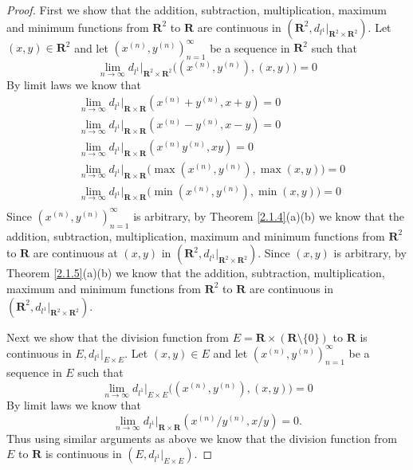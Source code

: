 \begin{proof}
    First we show that the addition, subtraction, multiplication, maximum and minimum functions from \(\mathbf{R}^2\) to \(\mathbf{R}\) are continuous in \((\mathbf{R}^2, d_{l^1}|_{\mathbf{R}^2 \times \mathbf{R}^2})\).
    Let \((x, y) \in \mathbf{R}^2\) and let \((x^{(n)}, y^{(n)})_{n = 1}^\infty\) be a sequence in \(\mathbf{R}^2\) such that
    \[
        \lim_{n \to \infty} d_{l^1}|_{\mathbf{R}^2 \times \mathbf{R}^2}\big((x^{(n)}, y^{(n)}), (x, y)\big) = 0
    \]
    By limit laws we know that
    \begin{align*}
         & \lim_{n \to \infty} d_{l^1}|_{\mathbf{R} \times \mathbf{R}}(x^{(n)} + y^{(n)}, x + y) = 0                   \\
         & \lim_{n \to \infty} d_{l^1}|_{\mathbf{R} \times \mathbf{R}}(x^{(n)} - y^{(n)}, x - y) = 0                   \\
         & \lim_{n \to \infty} d_{l^1}|_{\mathbf{R} \times \mathbf{R}}(x^{(n)} y^{(n)}, xy) = 0                        \\
         & \lim_{n \to \infty} d_{l^1}|_{\mathbf{R} \times \mathbf{R}}\big(\max(x^{(n)}, y^{(n)}), \max(x, y)\big) = 0 \\
         & \lim_{n \to \infty} d_{l^1}|_{\mathbf{R} \times \mathbf{R}}\big(\min(x^{(n)}, y^{(n)}), \min(x, y)\big) = 0 \\
    \end{align*}
    Since \((x^{(n)}, y^{(n)})_{n = 1}^\infty\) is arbitrary, by Theorem \ref{2.1.4}(a)(b) we know that the addition, subtraction, multiplication, maximum and minimum functions from \(\mathbf{R}^2\) to \(\mathbf{R}\) are continuous at \((x, y)\) in \((\mathbf{R}^2, d_{l^1}|_{\mathbf{R}^2 \times \mathbf{R}^2})\).
    Since \((x, y)\) is arbitrary, by Theorem \ref{2.1.5}(a)(b) we know that the addition, subtraction, multiplication, maximum and minimum functions from \(\mathbf{R}^2\) to \(\mathbf{R}\) are continuous in \((\mathbf{R}^2, d_{l^1}|_{\mathbf{R}^2 \times \mathbf{R}^2})\).

    Next we show that the division function from \(E = \mathbf{R} \times (\mathbf{R} \setminus \{0\})\) to \(\mathbf{R}\) is continuous in \(E, d_{l^1}|_{E \times E}\).
    Let \((x, y) \in E\) and let \((x^{(n)}, y^{(n)})_{n = 1}^\infty\) be a sequence in \(E\) such that
    \[
        \lim_{n \to \infty} d_{l^1}|_{E \times E}\big((x^{(n)}, y^{(n)}), (x, y)\big) = 0
    \]
    By limit laws we know that
    \[
        \lim_{n \to \infty} d_{l^1}|_{\mathbf{R} \times \mathbf{R}}(x^{(n)} / y^{(n)}, x / y) = 0.
    \]
    Thus using similar arguments as above we know that the division function from \(E\) to \(\mathbf{R}\) is continuous in \((E, d_{l^1}|_{E \times E})\).


\end{proof}
